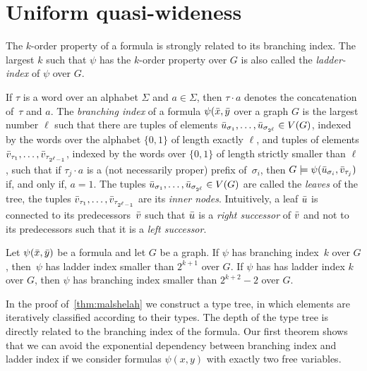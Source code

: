 

\section{Uniform quasi-wideness}\label{sec:uqw}

The $k$-order property of a formula is strongly related
to its branching index. The largest $k$ such that 
$\psi$ has the $k$-order property over $G$ is
also called the \emph{ladder-index} of $\psi$ over $G$. 

If $\tau$ is a word over an alphabet $\Sigma$ and
$a\in \Sigma$, then $\tau\cdot a$ denotes the concatenation of~$\tau$
and $a$.  The \emph{branching index} of a formula $\psi(\bar{x},\bar{y}$
over a graph $G$ is the largest number
$\ell$ such that there are tuples of elements
$\bar{u}_{\sigma_1},\ldots, \bar{u}_{\sigma_{2^\ell}}\in V(G)$, indexed by the
words over the alphabet $\{0,1\}$ of length exactly $\ell$, and
tuples of elements $\bar{v}_{\tau_1},\ldots, \bar{v}_{\tau_{2^\ell-1}}$, indexed by the
words over $\{0,1\}$ of length strictly smaller than $\ell$, such that
if $\tau_j\cdot a$ is a (not necessarily proper) prefix of~$\sigma_i$, then
$G\models \psi(\bar{u}_{\sigma_i},\bar{v}_{\tau_j})$ if, and only if, $a=1$. The tuples
$\bar{u}_{\sigma_1},\ldots, \bar{u}_{\sigma_{2^\ell}}\in V(G)$ are called the 
\emph{leaves} of the tree, the tuples $\bar{v}_{\tau_1},\ldots, \bar{v}_{\tau_{2^\ell-1}}$
are its \emph{inner nodes}. Intuitively, a leaf $\bar{u}$ is connected to its 
predecessors~$\bar{v}$ such
that $\bar{u}$ is a \emph{right successor} of $\bar{v}$ and not to its predecessors such that 
it is a \emph{left
successor}. 
     

\begin{lemma}\label{lem:branching}
  Let $\psi(\bar{x},\bar{y})$ be a formula and let $G$ be a graph. 
  If $\psi$ has branching index~$k$ over $G$, 
  then~$\psi$ has ladder index smaller than $2^{k+1}$ over $G$. 
  If $\psi$ has  has
  ladder index $k$ over $G$, then $\psi$ has branching index smaller than
  $2^{k+2}-2$ over $G$.
 \end{lemma}

In the proof of~\cref{thm:malshelah} we construct a type tree, in which
elements are iteratively classified according to their types. The depth of 
the type tree is directly related to the branching index of the formula. 
Our first theorem shows that we can avoid the exponential dependency 
between branching index and ladder index if we consider formulas $\psi(x,y)$
with exactly two free variables. 


